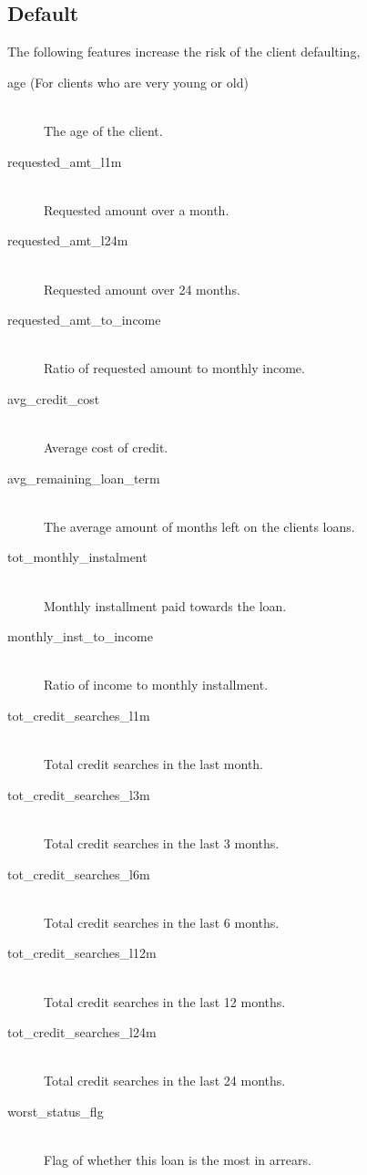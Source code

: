  \subsection{Default}
 The following features increase the risk of the client defaulting,
 \begin{description}
     \item[age (For clients who are very young or old)] \hfill \\ The age of the client.
     \item[requested\_amt\_l1m] \hfill \\ Requested amount over a month.
     \item[requested\_amt\_l24m] \hfill \\ Requested amount over 24 months.
     \item[requested\_amt\_to\_income] \hfill \\ Ratio of requested amount to monthly income.
     \item[avg\_credit\_cost] \hfill \\ Average cost of credit.
     \item[avg\_remaining\_loan\_term] \hfill \\ The average amount of months left on the clients loans.
     \item[tot\_monthly\_instalment] \hfill \\ Monthly installment paid towards the loan.
     \item[monthly\_inst\_to\_income] \hfill \\ Ratio of income to monthly installment.
     \item[tot\_credit\_searches\_l1m] \hfill \\ Total credit searches in the last month.
     \item[tot\_credit\_searches\_l3m] \hfill \\ Total credit searches in the last 3 months.
     \item[tot\_credit\_searches\_l6m] \hfill \\ Total credit searches in the last 6 months.
     \item[tot\_credit\_searches\_l12m] \hfill \\ Total credit searches in the last 12 months.
     \item[tot\_credit\_searches\_l24m] \hfill \\ Total credit searches in the last 24 months.
     \item[worst\_status\_flg] \hfill \\ Flag of whether this loan is the most in arrears.

\end{description}
